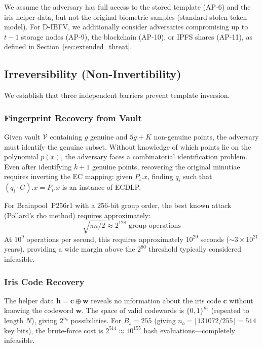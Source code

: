 \documentclass[3p,twocolumn]{elsarticle}
\newcommand{\DIBFV}{\textsf{D-IBFV}}
\begin{document}
We assume the adversary has full access to the stored template (AP-6) and the iris helper data, but not the original biometric samples (standard stolen-token model). For \DIBFV{}, we additionally consider adversaries compromising up to $t{-}1$ storage nodes (AP-9), the blockchain (AP-10), or IPFS shares (AP-11), as defined in Section~\ref{sec:extended_threat}.

\subsection{Irreversibility (Non-Invertibility)}
\label{sec:irreversibility}

We establish that three independent barriers prevent template inversion.

\subsubsection{Fingerprint Recovery from Vault}
Given vault $\mathcal{V}$ containing $g$ genuine and $5g + K$ non-genuine points, the adversary must identify the genuine subset. Without knowledge of which points lie on the polynomial $p(x)$, the adversary faces a combinatorial identification problem. Even after identifying $k+1$ genuine points, recovering the original minutiae requires inverting the EC mapping: given $P_i.x$, finding $q_i$ such that $(q_i \cdot G).x = P_i.x$ is an instance of ECDLP.

For Brainpool~P256r1 with a 256-bit group order, the best known attack (Pollard's rho method) requires approximately:
\begin{equation}
    \sqrt{\pi n / 2} \approx 2^{128} \text{ group operations}
    \label{eq:ecdlp_cost}
\end{equation}
At $10^9$ operations per second, this requires approximately $10^{29}$ seconds ($\sim\! 3 \times 10^{21}$ years), providing a wide margin above the $2^{80}$ threshold typically considered infeasible.

\subsubsection{Iris Code Recovery}
The helper data $\mathbf{h} = \mathbf{c} \oplus \mathbf{w}$ reveals no information about the iris code $\mathbf{c}$ without knowing the codeword $\mathbf{w}$. The space of valid codewords is $\{0,1\}^{n_b}$ (repeated to length $N$), giving $2^{n_b}$ possibilities. For $B_s = 255$ (giving $n_b = \lfloor 131072/255 \rfloor = 514$ key bits), the brute-force cost is $2^{514} \approx 10^{155}$ hash evaluations---completely infeasible.
\end{document}
